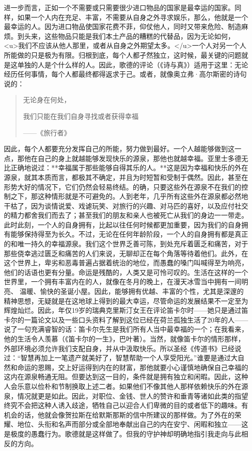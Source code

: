 \documentclass[12pt,oneside]{book}
\begin{document}
进一步而言，正如一个不需要或只需要很少进口物品的国家是最幸运的国家。同样，如果一个人内在充足、丰富，不需要从自身之外寻求娱乐，那么，他就是一个最幸运的人。因为进口物品使国家花费不菲，仰仗他人，同时又带来危险、制造麻烦。到头来，这些物品只能是我们本土产品的糟糕的代替品，因为无论如何，<u>我们不应该从他人那里，或者从自身之外期望太多。</u>一个人对另一个人所能做的只是极为有限。归根到底，每个人都孑然独立，这时候，最关键的问题就是这单独的人是个什么样的人。因此，歌德的评论（《诗与真》）适用于这里：无论经历任何事情，每个人都最终都得返求于己。或者，就像奥立弗·高尔斯密的诗句说的： 

 
\begin{quotation}
无论身在何处， 

我们只能在我们自身寻找或者获得幸福 

——《旅行者》 
\end{quotation}


因此，每个人都要充分发挥自己的所能，努力做到最好。一个人越能够做到这一点，那他在自己的身上就越能够发现快乐的源泉，那他也就越幸福。亚里士多德无比正确地说过：**幸福属于那些能够自得其乐的人。**这是因为幸福和快乐的外在源泉，就其本质而言，都极其不确定，并且为时短暂和受制于偶然。因此，甚至在形势大好的情况下，它们仍然会轻易终结。的确，只要这些外在源泉不在我们的控制之下，那这种情形就是不可避免的。人到老年，几乎所有这些外在源泉都必然地干枯了，因为谈情说爱、戏谑玩笑、对旅行的兴趣、对马匹的喜好，以及应付社交的精力都舍我们而去了；甚至我们的朋友和亲人也被死亡从我们的身边一一带走。此时此刻，一个人的自身拥有，比起以往任何时候都更加重要，因为我们的自身拥有能够保持得至为长久。不过，无论在任何年龄阶段，一个人的自身拥有都是真正的和唯一持久的幸福源泉。我们这个世界乏善可陈，到处充斥着匮乏和痛苦，对于那些侥幸逃过匮乏和痛苦的人们来说，无聊却正在每个角落等待着他们。此外，在这个世界上，卑劣和恶毒普遍占据着统治的地位，而愚蠢的嗓门叫喊得至为响亮，他们的话语也更有分量。命运是残酷的，人类又是可怜可叹的。生活在这样的一个世界里，一个拥有丰富内在的人，就像在冬月的晚上，在漫天冰雪当中拥有一间明亮、
温暖、愉快的圣诞小屋。因此，能够拥有优越、丰富的个性，尤其是深邃的精神思想，无疑就是在这地球上得到的最大幸运，尽管命运的发展结果不一定至为辉煌灿烂。因此，年仅19岁的瑞典克里斯汀女王在评论笛卡尔时——她只是通过笛卡尔的一篇论文以及一些口头资料了解到这位已经在荷兰孤独生活了20年的人——说了一句充满睿智的话：笛卡尔先生是我们所有人当中最幸福的一个；在我看来，他的生活令人羡慕（《笛卡尔的一生》，巴叶著）。当然，就像笛卡尔的情形那样，外部环境必须允许我们支配自身，并从中汲取快乐。所以圣经《传道书》已经说过：“智慧再加上一笔遗产就美好了，智慧帮助一个人享受阳光。”谁要是通过大自然和命运的恩赐，交上好运得到内在的财富，那他就要小心谨慎地确保自己幸福的这内在源泉畅通无阻。但要达到这一目的，条件就是拥有独立和闲暇。因此，这种人会乐意以俭朴和节制换取上述二者。如果他们不像其他人那样依赖快乐的外在源泉，情况就更是如此。因此，对职位、金钱、世人的赞许和垂青等诸如此类的指望终究不会把这种人诱入歧途，牺牲自己以迎合人们卑微的目的或者低下的趣味。有机会的话，他就会像贺拉斯在给默斯那斯的信中所建议的那样做。为了外在的荣耀、地位、头衔和名声而部分或全部地奉献出自己的内在安宁、闲暇和独立——这是极度的愚蠢行为。歌德就是这样做了。但我的守护神却明确地指引我走向与此相反的方向。 
\end{document}
